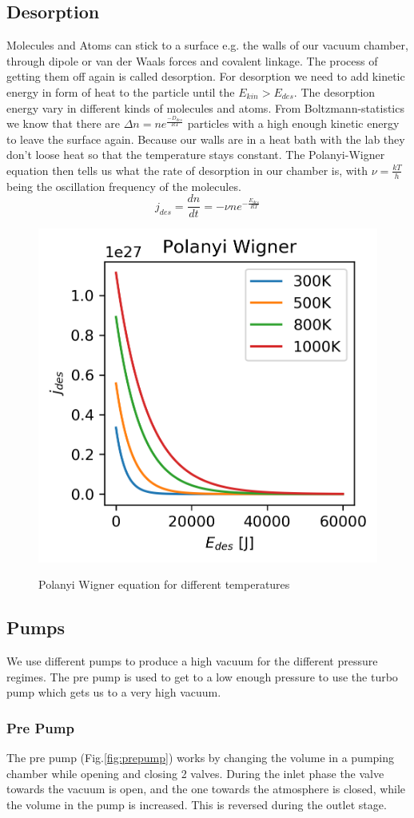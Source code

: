 \documentclass[]{article}
\begin{document}
\subsection{Desorption}
Molecules and Atoms can stick to a surface e.g. the walls of our vacuum chamber, through dipole or van der Waals forces and covalent linkage. The process of getting them off again is called desorption. For desorption we need to add kinetic energy in form of heat to the particle until the $E_{kin}>E_{des}$. The desorption energy vary in different kinds of molecules and atoms. From Boltzmann-statistics we know that there are $\Delta n=ne^{\frac{-D_{des}}{RT}}$ particles with a high enough kinetic energy to leave the surface again. Because our walls are in a heat bath with the lab they don't loose heat so that the temperature stays constant. The Polanyi-Wigner equation then tells us what the rate of desorption in our chamber is, with $\nu=\frac{kT}{h}$ being the oscillation frequency of the molecules.\[ j_{des}=\frac{dn}{dt}=-\nu n e^{-\frac{E_{des}}{RT}} \] 
\begin{figure}
	\includegraphics[width=0.7\linewidth]{"Plots/Polanyi Wigner"}
	\label{fig:polanyi}
	\caption{Polanyi Wigner equation for different temperatures}
\end{figure}


\subsection{Pumps}
We use different pumps to produce a high vacuum for the different pressure regimes. The pre pump is used to get to a low enough pressure to use the turbo pump which gets us to a very high vacuum.
\subsubsection{Pre Pump}
The pre pump (Fig.\ref{fig:prepump}) works by changing the volume in a pumping chamber while opening and closing 2 valves. During the inlet phase the valve towards the vacuum is open, and the one towards the atmosphere is closed, while the volume in the pump is increased. This is reversed during the outlet stage.
\end{document}
